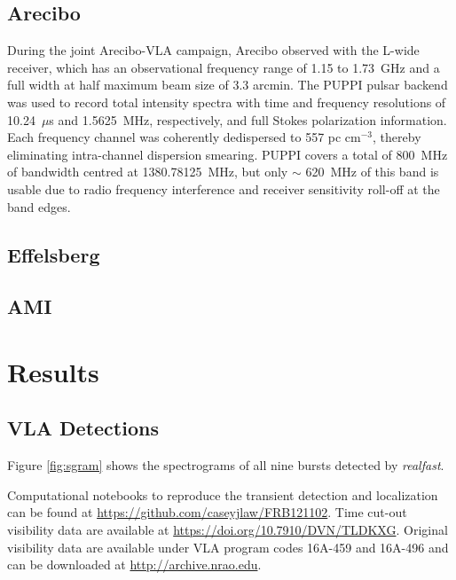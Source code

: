 \documentclass{emulateapj}
\newcommand{\rf}{\emph{realfast}}
\begin{document}
\subsection{Arecibo}

During the joint Arecibo-VLA campaign, Arecibo observed with the L-wide receiver, which has an observational frequency range of 1.15 to 1.73~GHz and a full width at half maximum beam size of 3.3 arcmin. The PUPPI pulsar backend was used to record total intensity spectra with time and frequency resolutions of 10.24~$\mu$s and 1.5625~MHz, respectively, and full Stokes polarization information. Each frequency channel was coherently dedispersed to 557 pc cm$^{-3}$, thereby eliminating intra-channel dispersion smearing. PUPPI covers a total of 800~MHz of bandwidth centred at 1380.78125~MHz, but only $\sim$ 620~MHz of this band is usable due to radio frequency interference and receiver sensitivity roll-off at the band edges.

\subsection{Effelsberg}



\subsection{AMI}



\section{Results}

\subsection{VLA Detections}

Figure \ref{fig:sgram} shows the spectrograms of all nine bursts detected by \rf.

Computational notebooks to reproduce the transient detection and localization can be found at \url{https://github.com/caseyjlaw/FRB121102}. Time cut-out visibility data are available at \url{https://doi.org/10.7910/DVN/TLDKXG}. Original visibility data are available under VLA program codes 16A-459 and 16A-496 and can be downloaded at \url{http://archive.nrao.edu}.
\end{document}
